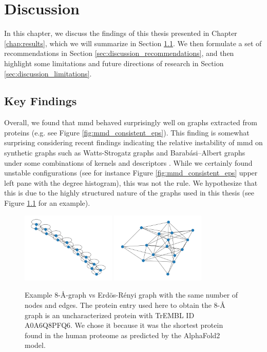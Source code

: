 \chapter{Discussion}\label{chap:discussion}

In this chapter, we discuss the findings of this thesis presented in Chapter
\ref{chap:results}, which we will summarize in Section \ref{sec:key_findings}.
We then formulate a set of recommendations in Section
\ref{sec:discussion_recommendations}, and then highlight some limitations and
future directions of research in Section \ref{sec:discussion_limitations}.

\section{Key Findings}\label{sec:key_findings}

Overall, we found that \acrshort{mmd} behaved surprisingly well on graphs extracted from
proteins (e.g. see Figure \ref{fig:mmd_consistent_eps}). This finding is
somewhat surprising considering recent findings indicating the relative
instability of \acrshort{mmd} on synthetic graphs such as Watts-Strogatz graphs and
Barabási–Albert graphs under some combinations of kernels and descriptors
\citep{obray2022evaluation}. While we certainly found unstable configurations
(see for instance Figure \ref{fig:mmd_consistent_eps} upper left pane with the degree histogram),
this was not the rule. We hypothesize that this is due to the highly structured
nature of the graphs used in this thesis (see Figure
\ref{fig:er_comparison_8a_graph} for an example).

\begin{figure}
  \centering
  \includegraphics[width=0.4\textwidth]{./figures/results/8_a_graph.pdf}
  \includegraphics[width=0.4\textwidth]{./figures/results/er_graph_8_a_params.pdf}
  \caption[Example 8-\si{\angstrom}-graph vs Erd\"os-Rényi graph with the same
  number of nodes and edges.]{Example 8-\si{\angstrom}-graph vs Erd\"os-Rényi graph with the same
    number of nodes and edges. The protein entry used here to obtain the
    8-\si{\angstrom} graph is an uncharacterized protein with TrEMBL ID
    A0A6Q8PFQ6. We chose it because it was the shortest protein found in the
    human proteome as predicted by the AlphaFold2 model.}
  \label{fig:er_comparison_8a_graph}
\end{figure}

